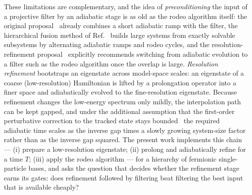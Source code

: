 \documentclass[
  aps,            %
  prc,            %
  reprint,        %
  superscriptaddress,
  floatfix,
  nofootinbib
]{revtex4-2}
\begin{document}
These limitations are complementary, and the idea of \emph{preconditioning} the
input of a projective filter by an adiabatic stage is as old as the rodeo
algorithm itself: the original proposal~\cite{Choi2021} already combines a
short adiabatic ramp with the filter, the hierarchical fusion method of
Ref.~\cite{Patkowski2025fusion} builds large systems from exactly solvable
subsystems by alternating adiabatic ramps and rodeo cycles, and the
resolution-refinement proposal~\cite{Bogner2026} explicitly recommends
switching from adiabatic evolution to a filter such as the rodeo algorithm once
the overlap is large.  \emph{Resolution refinement} bootstraps an eigenstate
across model-space scales: an eigenstate of a coarse (low-resolution)
Hamiltonian is lifted by a prolongation operator into a finer space and
adiabatically evolved to the fine-resolution eigenstate.  Because refinement
changes the low-energy spectrum only mildly, the interpolation path can be
kept gapped, and under the additional assumption that the first-order
perturbative correction to the tracked state stays bounded~\cite{Bogner2026}
the required adiabatic time scales as the inverse gap times a slowly growing
system-size factor rather than as the inverse gap squared.  The present work
implements this chain --- (i) prepare a low-resolution eigenstate; (ii) prolong
and adiabatically refine for a time $T$; (iii) apply the rodeo algorithm ---
for a hierarchy of fermionic single-particle bases, and asks the question that
decides whether the refinement stage earns its gates: does refinement followed
by filtering beat filtering the best input that is available cheaply?
\end{document}
